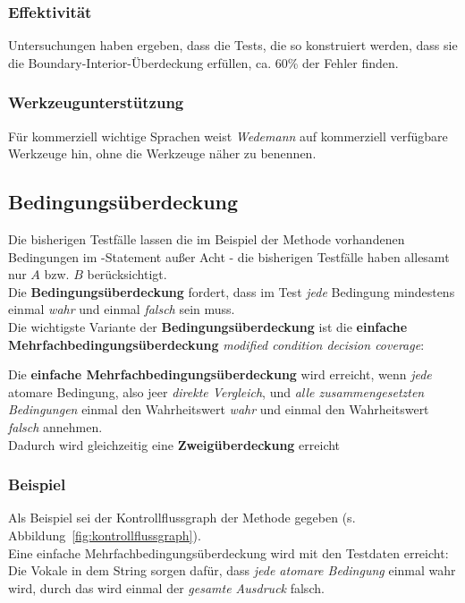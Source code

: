 \subsubsection*{Effektivität}
Untersuchungen haben ergeben, dass die Tests, die so konstruiert werden, dass sie die Boundary-Interior-Überdeckung erfüllen, ca. 60\% der Fehler finden.

\subsubsection*{Werkzeugunterstützung}
Für kommerziell wichtige Sprachen weist \textit{Wedemann} auf kommerziell verfügbare Werkzeuge hin, ohne die Werkzeuge näher zu benennen.

\subsection{Bedingungsüberdeckung}
Die bisherigen Testfälle lassen die im Beispiel der Methode  vorhandenen Bedingungen im -Statement außer Acht - die bisherigen Testfälle haben allesamt nur $A$ bzw. $B$ berücksichtigt.\\
Die \textbf{Bedingungsüberdeckung} fordert, dass im Test \textit{jede} Bedingung mindestens einmal \textit{wahr} und einmal \textit{falsch} sein muss.\\
Die wichtigste Variante der \textbf{Bedingungsüberdeckung} ist die \textbf{einfache Mehrfachbedingungsüberdeckung} \textit{modified condition decision coverage}:

\begin{tcolorbox}[title=Einfache Mehrfachbedingungsüberdeckung]
Die \textbf{einfache Mehrfachbedingungsüberdeckung} wird erreicht, wenn \textit{jede} atomare Bedingung, also jeer \textit{direkte Vergleich}, und \textit{alle zusammengesetzten Bedingungen} einmal den Wahrheitswert \textit{wahr} und einmal den Wahrheitswert \textit{falsch} annehmen.\\
    Dadurch wird gleichzeitig eine \textbf{Zweigüberdeckung} erreicht
\end{tcolorbox}

\subsubsection*{Beispiel}
Als Beispiel sei der Kontrollflussgraph der Methode  gegeben (s. Abbildung~\ref{fig:kontrollflussgraph}).\\
Eine einfache Mehrfachbedingungsüberdeckung wird mit den Testdaten  erreicht: Die Vokale in dem String sorgen dafür, dass \textit{jede atomare Bedingung} einmal wahr wird, durch das  wird einmal der \textit{gesamte Ausdruck} falsch.

